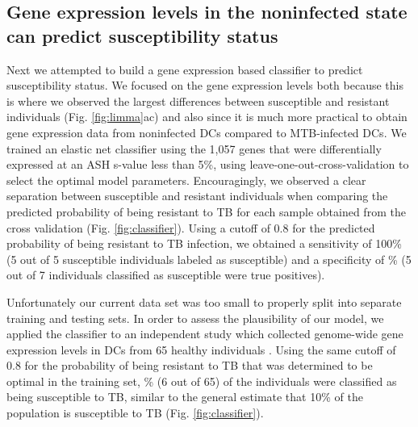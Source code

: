 \documentclass[fleqn,10pt]{wlscirep}
\begin{document}
\subsection*{Gene expression levels in the noninfected state can predict susceptibility status}

Next we attempted to build a gene expression based classifier to predict susceptibility status. We focused on the gene expression levels both because this is where we observed the largest differences between susceptible and resistant individuals (Fig. \ref{fig:limma}ac) and also since it is much more practical to obtain gene expression data from noninfected DCs compared to MTB-infected DCs. We trained an elastic net classifier using the 1,057 genes that were differentially expressed at an ASH s-value \cite{Stephens2016} less than 5\%, using leave-one-out-cross-validation to select the optimal model parameters. Encouragingly, we observed a clear separation between susceptible and resistant individuals when comparing the predicted probability of being resistant to TB for each sample obtained from the cross validation (Fig. \ref{fig:classifier}). Using a cutoff of 0.8 for the predicted probability of being resistant to TB infection, we obtained a sensitivity of 100\% (5 out of 5 susceptible individuals labeled as susceptible) and a specificity of \% (5 out of 7 individuals classified as susceptible were true positives).

Unfortunately our current data set was too small to properly split into separate training and testing sets. In order to assess the plausibility of our model, we applied the classifier to an independent study which collected genome-wide gene expression levels in DCs from 65 healthy individuals \cite{Barreiro2012}. Using the same cutoff of 0.8 for the probability of being resistant to TB that was determined to be optimal in the training set, \% (6 out of 65) of the individuals were classified as being susceptible to TB, similar to the general estimate that 10\% of the population is susceptible to TB (Fig. \ref{fig:classifier}).
\end{document}
